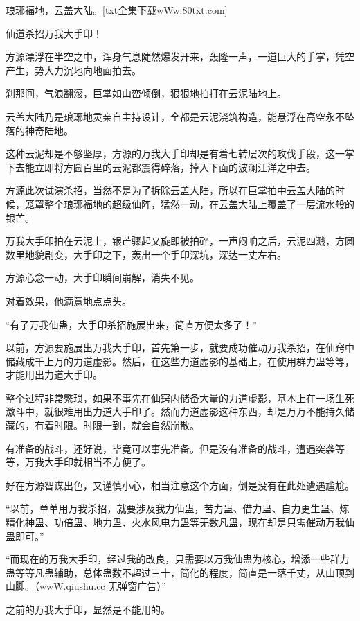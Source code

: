 
\begin{this_body}

琅琊福地，云盖大陆。[txt全集下载wWw.80txt.com]

仙道杀招万我大手印！

方源漂浮在半空之中，浑身气息陡然爆发开来，轰隆一声，一道巨大的手掌，凭空产生，势大力沉地向地面拍去。

刹那间，气浪翻滚，巨掌如山峦倾倒，狠狠地拍打在云泥陆地上。

云盖大陆乃是琅琊地灵亲自主持设计，全都是云泥浇筑构造，能悬浮在高空永不坠落的神奇陆地。

这种云泥却是不够坚厚，方源的万我大手印却是有着七转层次的攻伐手段，这一掌下去能立即将方圆百里的云泥都震得碎落，掉入下面的波澜汪洋之中去。

方源此次试演杀招，当然不是为了拆除云盖大陆，所以在巨掌拍中云盖大陆的时候，笼罩整个琅琊福地的超级仙阵，猛然一动，在云盖大陆上覆盖了一层流水般的银芒。

万我大手印拍在云泥上，银芒骤起又旋即被拍碎，一声闷响之后，云泥四溅，方圆数里地貌剧变，大手印之下，轰出一个手印深坑，深达一丈左右。

方源心念一动，大手印瞬间崩解，消失不见。

对着效果，他满意地点点头。

“有了万我仙蛊，大手印杀招施展出来，简直方便太多了！”

以前，方源要施展出万我大手印，首先第一步，就要成功催动万我杀招，在仙窍中储藏成千上万的力道虚影。然后，在这些力道虚影的基础上，在使用群力蛊等等，才能用出力道大手印。

整个过程非常繁琐，如果不事先在仙窍内储备大量的力道虚影，基本上在一场生死激斗中，就很难用出力道大手印了。然而力道虚影这种东西，却是万万不能持久储藏的，有着时限。时限一到，就会自然崩散。

有准备的战斗，还好说，毕竟可以事先准备。但是没有准备的战斗，遭遇突袭等等，万我大手印就相当不方便了。

好在方源智谋出色，又谨慎小心，相当注意这个方面，倒是没有在此处遭遇尴尬。

“以前，单单用万我杀招，就要涉及我力仙蛊，苦力蛊、借力蛊、自力更生蛊、炼精化神蛊、功倍蛊、地力蛊、火水风电力蛊等无数凡蛊，现在却是只需催动万我仙蛊即可。”

“而现在的万我大手印，经过我的改良，只需要以万我仙蛊为核心，增添一些群力蛊等等凡蛊辅助，总体蛊数不超过三十，简化的程度，简直是一落千丈，从山顶到山脚。（wwW.qiushu.cc 无弹窗广告）”

之前的万我大手印，显然是不能用的。


\end{this_body}
